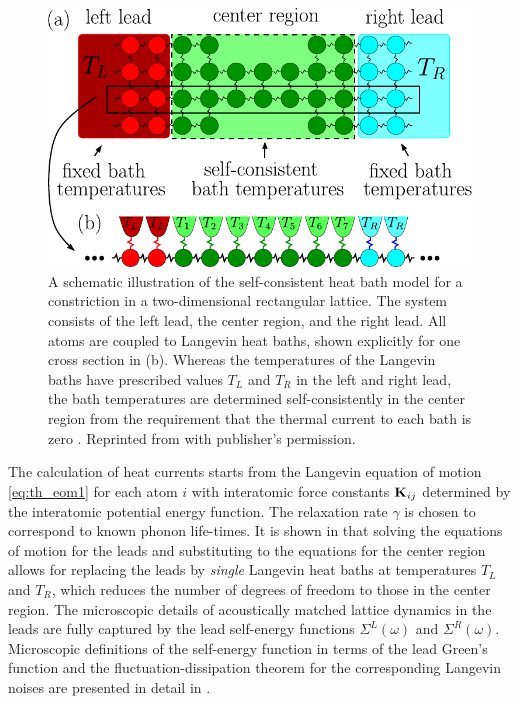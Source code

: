 \begin{figure}
\begin{center}
 \includegraphics[width=.99\columnwidth]{pics/gf_fig1.pdf}
 \caption{A schematic illustration of the self-consistent heat bath model for a constriction in a two-dimensional rectangular lattice. The system consists of the left lead, the center region, and the right lead. All atoms are coupled to Langevin heat baths, shown explicitly for one cross section in (b). Whereas the temperatures of the Langevin baths have prescribed values $T_L$ and $T_R$ in the left and right lead, the bath temperatures are determined self-consistently in the center region from the requirement that the thermal current to each bath is zero \cite{bolsterli70}. Reprinted from  with publisher's permission.}
\label{fig:schb_setup}
\end{center}
\end{figure} 

The calculation of heat currents starts from the Langevin equation of motion \eqref{eq:th_eom1} for each atom $i$ with interatomic force constants $\mathbf{K}_{ij}$ determined by the interatomic potential energy function. The relaxation rate $\gamma$ is chosen to correspond to known phonon life-times. It is shown in  that solving the equations of motion for the leads and substituting to the equations for the center region allows for replacing the leads by \textit{single} Langevin heat baths at temperatures $T_L$ and $T_R$, which reduces the number of degrees of freedom to those in the center region. The microscopic details of acoustically matched lattice dynamics in the leads are fully captured by the lead self-energy functions $\Sigma^L(\omega)$ and $\Sigma^R(\omega)$. Microscopic definitions of the self-energy function in terms of the lead Green's function and the fluctuation-dissipation theorem for the corresponding Langevin noises are presented in detail in .



